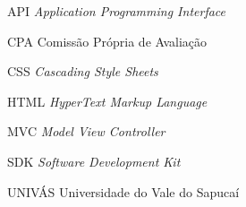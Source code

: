 
\begin{SingleSpace}

	\begin{siglas}
		\item[API]		\textit{Application Programming Interface}
		\item[CPA] 		Comissão Própria de Avaliação
		\item[CSS] 		\textit{Cascading Style Sheets}
		\item[HTML] 	\textit{HyperText Markup Language}
		\item[MVC] 		\textit{Model View Controller}
		\item[SDK]  	\textit{Software Development Kit}
		\item[UNIVÁS]   Universidade do Vale do Sapucaí
	\end{siglas}

\end{SingleSpace}
